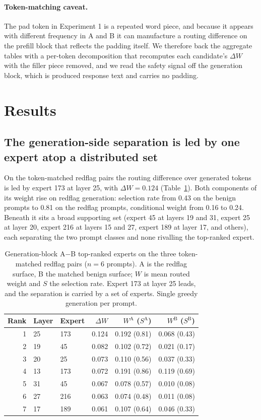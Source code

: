 \documentclass[10pt,twocolumn]{article}
\begin{document}
\paragraph{Token-matching caveat.}
The pad token in Experiment 1 is a repeated word piece, and because it appears
with different frequency in A and B it can manufacture a routing difference on
the prefill block that reflects the padding itself. We
therefore back the aggregate tables with a per-token decomposition that
recomputes each candidate's $\Delta W$ with the filler piece removed, and we
read the safety signal off the generation block, which is produced response
text and carries no padding.

\section{Results}
\label{sec:results}

\subsection{The generation-side separation is led by one expert atop a distributed set}
\label{sec:lead}

On the token-matched redflag pairs the routing difference over generated
tokens is led by expert 173 at layer 25, with $\Delta W=0.124$
(Table~\ref{tab:gen-leaders}). Both components of its weight rise on redflag
generation: selection rate from 0.43 on the benign prompts to 0.81 on the
redflag prompts, conditional weight from 0.16 to 0.24. Beneath it sits a
broad supporting set (expert 45 at layers 19 and 31, expert 25 at layer 20,
expert 216 at layers 15 and 27, expert 189 at layer 17, and others), each
separating the two prompt classes and none rivalling the top-ranked expert.

\begin{table}[t]
\centering
\small
\setlength{\tabcolsep}{3pt}
\begin{tabular}{rllrrr}
\toprule
Rank & Layer & Expert & $\Delta W$ & $W^{\mathrm{A}}$ ($S^{\mathrm{A}}$) & $W^{\mathrm{B}}$ ($S^{\mathrm{B}}$) \\
\midrule
1 & 25 & 173 & 0.124 & 0.192 (0.81) & 0.068 (0.43) \\
2 & 19 & 45  & 0.082 & 0.102 (0.72) & 0.021 (0.17) \\
3 & 20 & 25  & 0.073 & 0.110 (0.56) & 0.037 (0.33) \\
4 & 13 & 173 & 0.072 & 0.191 (0.86) & 0.119 (0.69) \\
5 & 31 & 45  & 0.067 & 0.078 (0.57) & 0.010 (0.08) \\
6 & 27 & 216 & 0.063 & 0.074 (0.48) & 0.011 (0.08) \\
7 & 17 & 189 & 0.061 & 0.107 (0.64) & 0.046 (0.33) \\
\bottomrule
\end{tabular}
\caption{Generation-block A$-$B top-ranked experts on the three token-matched
redflag pairs ($n=6$ prompts). A is the redflag surface, B the matched benign
surface; $W$ is mean routed weight and $S$ the selection rate. Expert 173 at
layer 25 leads, and the separation is carried by a set of experts. Single
greedy generation per prompt.}
\label{tab:gen-leaders}
\end{table}
\end{document}
